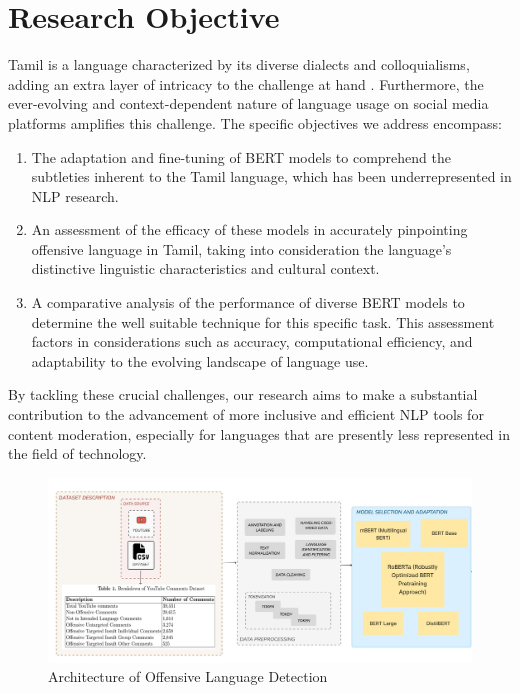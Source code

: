 \documentclass{svproc}
\begin{document}
\section{Research Objective}
Tamil is a language characterized by its diverse dialects and colloquialisms, adding an extra layer of intricacy to the challenge at hand \cite{quoc2023vietnamese}. Furthermore, the ever-evolving and context-dependent nature of language usage on social media platforms amplifies this challenge. The specific objectives we address encompass:

\begin{enumerate}
    \item The adaptation and fine-tuning of BERT models to comprehend the subtleties inherent to the Tamil language, which has been underrepresented in NLP research.
    \item An assessment of the efficacy of these models in accurately pinpointing offensive language in Tamil, taking into consideration the language's distinctive linguistic characteristics and cultural context.
    \item A comparative analysis of the performance of diverse BERT models to determine the well suitable technique for this specific task. This assessment factors in considerations such as accuracy, computational efficiency, and adaptability to the evolving landscape of language use.
\end{enumerate}

By tackling these crucial challenges, our research aims to make a substantial contribution to the advancement of more inclusive and efficient NLP tools for content moderation, especially for languages that are presently less represented in the field of technology\cite{saeed2023detection}.
\begin{figure}[h]
\centering
\includegraphics[width=1.1\linewidth]{Figures/architecture.jpg}
\caption{Architecture of Offensive Language Detection }
\label{fig:performance-metrics}
\end{figure}
\end{document}
